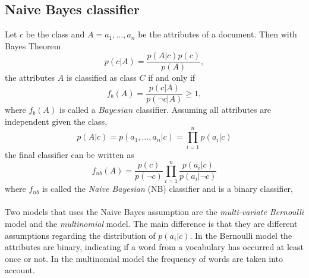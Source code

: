 \subsection{Naive Bayes classifier}
Let $c$ be the class and $A = a_1, \dots ,a_n$ be the attributes of a document. Then with Bayes Theorem
\begin{equation}
p(c|A)=\frac{p(A|c)p(c)}{p(A)},
\end{equation}
the attributes $A$ is classified as class $C$ if and only if
\begin{equation}
f_b(A)=\frac{p(c|A)}{p(\neg c|A)} \geq 1,
\end{equation}
where $f_b(A)$ is called a $Bayesian$ classifier. Assuming all attributes are independent given the class, 
\[
p(A|c)=p(a_1,\dots ,a_n | c) = \prod_{i=1}^n p(a_i|c)
\]
the final classifier can be written as
\begin{equation}
f_{nb}(A) = \frac{p(c)}{p(\neg c)}\prod_{i=1}^n\frac{p(a_i|c)}{p(a_i|\neg c)}
\end{equation}
where $f_{nb}$ is called the \emph{Naive Bayesian} (NB) classifier and is a binary classifier,  \\\\
Two models that uses the Naive Bayes assumption are the \emph{multi-variate Bernoulli} model and the \emph{multinomial} model. The main difference is that they are different assumptions regarding the distribution of $p(a_i|c)$. In the Bernoulli model the attributes are binary, indicating if a word from a vocabulary has occurred at least once or not. In the multinomial model the frequency of words are taken into account.